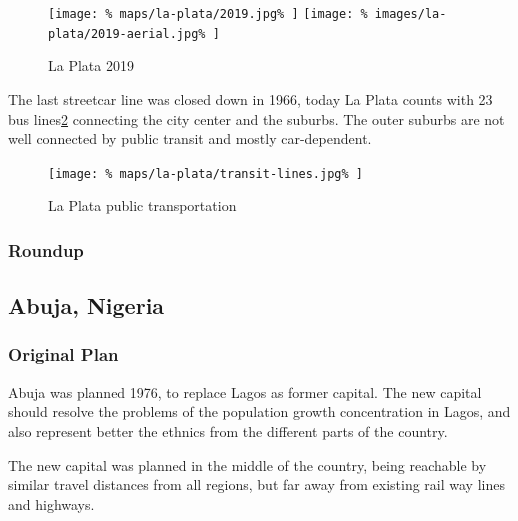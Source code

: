 \documentclass[twocolumn]{article}
\begin{document}
			\begin{figure}[H]
				\texttt{[image: \%
					maps/la-plata/2019.jpg\%
				]}
				\texttt{[image: \%
					images/la-plata/2019-aerial.jpg\%
				]}
				\caption{La Plata 2019\cite{OpenStreetMap:LaPlata}}
				\label{fig:map:la-plata-2019}
			\end{figure}
			
			The last streetcar line was closed down in 1966, today La Plata counts with 23 bus lines\ref{fig:map:la-plata-transit} connecting the city center and the suburbs.
			The outer suburbs are not well connected by public transit and mostly car-dependent.
			
			\begin{figure}[H]
				\texttt{[image: \%
					maps/la-plata/transit-lines.jpg\%
				]}
				\caption{La Plata public transportation\cite{OpenStreetMap:LaPlata}}
				\label{fig:map:la-plata-transit}
			\end{figure}
			
			
			
			\subsubsection{Roundup}
			
			
			
		\clearpage
		\begin{strip}
		\subsection{Abuja, Nigeria}
		\end{strip}
		
			
			
			\subsubsection{Original Plan}
			
			Abuja was planned 1976, to replace Lagos as former capital.
			The new capital should resolve the problems of the population growth concentration in Lagos, and also represent better the ethnics from the different parts of the country.
			
			The new capital was planned in the middle of the country, being reachable by similar travel distances from all regions, but far away from existing rail way lines and highways.
			
\end{document}
